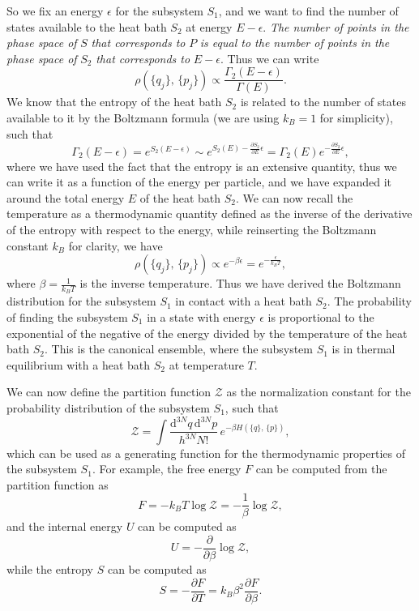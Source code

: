 So we fix an energy \(\epsilon\) for the subsystem \(S_1\), and we want to find the number of states available to the heat bath \(S_2\) at energy \(E - \epsilon\). \textit{The number of points in the phase space of} \(S\) \textit{that corresponds to} \(P\) \textit{is equal to the number of points in the phase space of} \(S_2\) \textit{that corresponds to} \(E - \epsilon\). Thus we can write
\[
    \rho(\{q_j\},\,\{p_j\}) \propto \frac{\Gamma_2(E - \epsilon)}{\Gamma(E)}.
\]
We know that the entropy of the heat bath \(S_2\) is related to the number of states available to it by the Boltzmann formula (we are using \(k_B=1\) for simplicity), such that
\[
    \Gamma_2(E - \epsilon) = e^{S_2(E - \epsilon)} \sim e^{S_2(E) - \frac{\partial S_2}{\partial E} \epsilon} = \Gamma_2(E)e^{-\frac{\partial S_2}{\partial E} \epsilon},
\]
where we have used the fact that the entropy is an extensive quantity, thus we can write it as a function of the energy per particle, and we have expanded it around the total energy \(E\) of the heat bath \(S_2\). We can now recall the temperature as a thermodynamic quantity defined as the inverse of the derivative of the entropy with respect to the energy, while reinserting the Boltzmann constant \(k_B\) for clarity, we have
\[
    \rho(\{q_j\},\,\{p_j\}) \propto e^{-\beta \epsilon} = e^{- \frac{\epsilon}{k_B T}},
\]
where \(\beta = \frac{1}{k_B T}\) is the inverse temperature. Thus we have derived the Boltzmann distribution for the subsystem \(S_1\) in contact with a heat bath \(S_2\). The probability of finding the subsystem \(S_1\) in a state with energy \(\epsilon\) is proportional to the exponential of the negative of the energy divided by the temperature of the heat bath \(S_2\). This is the canonical ensemble, where the subsystem \(S_1\) is in thermal equilibrium with a heat bath \(S_2\) at temperature \(T\).

We can now define the partition function \(\mathcal{Z}\) as the normalization constant for the probability distribution of the subsystem \(S_1\), such that
\begin{equation}
    \mathcal{Z} = \int \frac{\mathrm{d}^{3N}q \, \mathrm{d}^{3N}p}{h^{3N}N!} \, e^{-\beta H(\{q\},\,\{p\})},
    \label{eq:canonical_partition_function}
\end{equation}
which can be used as a generating function for the thermodynamic properties of the subsystem \(S_1\). For example, the free energy \(F\) can be computed from the partition function as
\begin{equation}
    F = -k_B T \log \mathcal{Z} = -\frac{1}{\beta} \log \mathcal{Z},
    \label{eq:canonical_free_energy}
\end{equation}
and the internal energy \(U\) can be computed as
\begin{equation}
    U = -\frac{\partial}{\partial \beta} \log \mathcal{Z},
\end{equation}
while the entropy \(S\) can be computed as
\begin{equation}
    S = -\frac{\partial F}{\partial T} = k_B \beta^2 \frac{\partial F}{\partial \beta}.
\end{equation}

